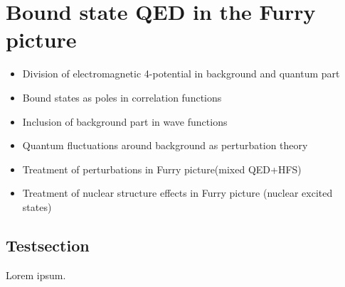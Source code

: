 \chapter{Bound state QED in the Furry picture}
\label{ch:furry_pic}

\begin{itemize}
\item Division of electromagnetic 4-potential in background and quantum part
\item Bound states as poles in correlation functions
\item Inclusion of background part in wave functions
\item Quantum fluctuations around background as perturbation theory
\item Treatment of perturbations in Furry picture(mixed QED+HFS)
\item Treatment of nuclear structure effects in Furry picture (nuclear excited states)\cite{Michel2018}
\end{itemize} 
\newpage
\section{Testsection}
Lorem ipsum.






